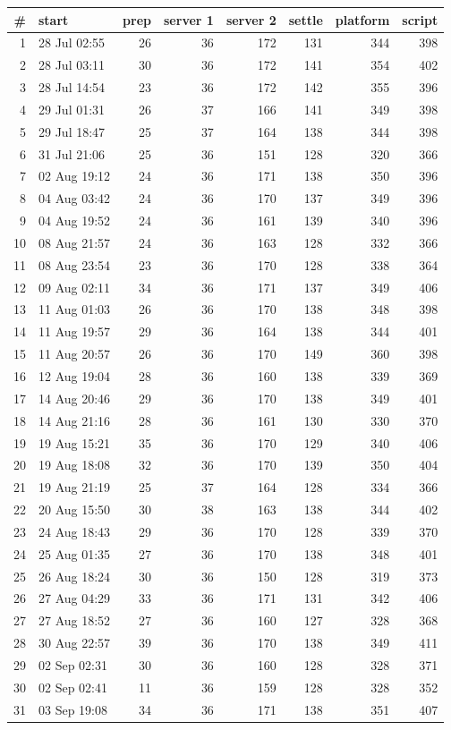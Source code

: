 \documentclass[11pt]{article}
\begin{document}
\begin{center}
\footnotesize
\begin{tabular}{@{}rlrrrrrr@{}}
\toprule
\# & start & prep & server 1 & server 2 & settle & platform & script \\
\midrule
1 & 28 Jul 02:55 & 26 & 36 & 172 & 131 & 344 & 398 \\
2 & 28 Jul 03:11 & 30 & 36 & 172 & 141 & 354 & 402 \\
3 & 28 Jul 14:54 & 23 & 36 & 172 & 142 & 355 & 396 \\
4 & 29 Jul 01:31 & 26 & 37 & 166 & 141 & 349 & 398 \\
5 & 29 Jul 18:47 & 25 & 37 & 164 & 138 & 344 & 398 \\
6 & 31 Jul 21:06 & 25 & 36 & 151 & 128 & 320 & 366 \\
7 & 02 Aug 19:12 & 24 & 36 & 171 & 138 & 350 & 396 \\
8 & 04 Aug 03:42 & 24 & 36 & 170 & 137 & 349 & 396 \\
9 & 04 Aug 19:52 & 24 & 36 & 161 & 139 & 340 & 396 \\
10 & 08 Aug 21:57 & 24 & 36 & 163 & 128 & 332 & 366 \\
11 & 08 Aug 23:54 & 23 & 36 & 170 & 128 & 338 & 364 \\
12 & 09 Aug 02:11 & 34 & 36 & 171 & 137 & 349 & 406 \\
13 & 11 Aug 01:03 & 26 & 36 & 170 & 138 & 348 & 398 \\
14 & 11 Aug 19:57 & 29 & 36 & 164 & 138 & 344 & 401 \\
15 & 11 Aug 20:57 & 26 & 36 & 170 & 149 & 360 & 398 \\
16 & 12 Aug 19:04 & 28 & 36 & 160 & 138 & 339 & 369 \\
17 & 14 Aug 20:46 & 29 & 36 & 170 & 138 & 349 & 401 \\
18 & 14 Aug 21:16 & 28 & 36 & 161 & 130 & 330 & 370 \\
19 & 19 Aug 15:21 & 35 & 36 & 170 & 129 & 340 & 406 \\
20 & 19 Aug 18:08 & 32 & 36 & 170 & 139 & 350 & 404 \\
21 & 19 Aug 21:19 & 25 & 37 & 164 & 128 & 334 & 366 \\
22 & 20 Aug 15:50 & 30 & 38 & 163 & 138 & 344 & 402 \\
23 & 24 Aug 18:43 & 29 & 36 & 170 & 128 & 339 & 370 \\
24 & 25 Aug 01:35 & 27 & 36 & 170 & 138 & 348 & 401 \\
25 & 26 Aug 18:24 & 30 & 36 & 150 & 128 & 319 & 373 \\
26 & 27 Aug 04:29 & 33 & 36 & 171 & 131 & 342 & 406 \\
27 & 27 Aug 18:52 & 27 & 36 & 160 & 127 & 328 & 368 \\
28 & 30 Aug 22:57 & 39 & 36 & 170 & 138 & 349 & 411 \\
29 & 02 Sep 02:31 & 30 & 36 & 160 & 128 & 328 & 371 \\
30 & 02 Sep 02:41 & 11 & 36 & 159 & 128 & 328 & 352 \\
31 & 03 Sep 19:08 & 34 & 36 & 171 & 138 & 351 & 407 \\
\bottomrule
\end{tabular}
\end{center}
\end{document}
